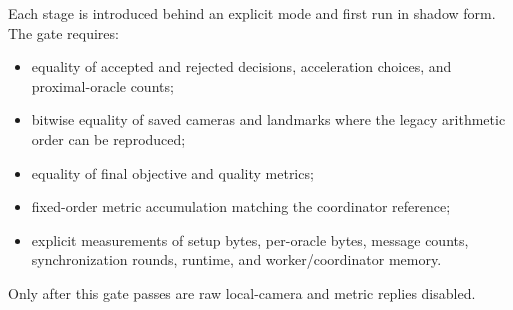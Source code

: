 Each stage is introduced behind an explicit mode and first run in shadow form.
The gate requires:
\begin{itemize}
  \item equality of accepted and rejected decisions, acceleration choices, and
        proximal-oracle counts;
  \item bitwise equality of saved cameras and landmarks where the legacy
        arithmetic order can be reproduced;
  \item equality of final objective and quality metrics;
  \item fixed-order metric accumulation matching the coordinator reference;
  \item explicit measurements of setup bytes, per-oracle bytes, message counts,
        synchronization rounds, runtime, and worker/coordinator memory.
\end{itemize}
Only after this gate passes are raw local-camera and metric replies disabled.

